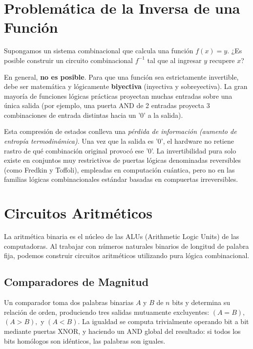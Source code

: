 \section{Problemática de la Inversa de una Función}
Supongamos un sistema combinacional que calcula una función $f(x) = y.$ ¿Es posible construir un circuito combinacional $f^{-1}$ tal que al ingresar $y$ recupere $x$?

En general, \textbf{no es posible}. Para que una función sea estrictamente invertible, debe ser matemática y lógicamente \textbf{biyectiva} (inyectiva y sobreyectiva). La gran mayoría de funciones lógicas prácticas proyectan muchas entradas sobre una única salida (por ejemplo, una puerta AND de 2 entradas proyecta 3 combinaciones de entrada distintas hacia un '0' a la salida).

Esta compresión de estados conlleva una \textit{pérdida de información (aumento de entropía termodinámica)}. Una vez que la salida es '0', el hardware no retiene rastro de qué combinación original provocó ese '0'. La invertibilidad pura solo existe en conjuntos muy restrictivos de puertas lógicas denominadas reversibles (como Fredkin y Toffoli), empleadas en computación cuántica, pero no en las familias lógicas combinacionales estándar basadas en compuertas irreversibles.

\section{Circuitos Aritméticos}
La aritmética binaria es el núcleo de las ALUs (Arithmetic Logic Units) de las computadoras. Al trabajar con números naturales binarios de longitud de palabra fija, podemos construir circuitos aritméticos utilizando pura lógica combinacional.

\subsection{Comparadores de Magnitud}
Un comparador toma dos palabras binarias $A$ y $B$ de $n$ bits y determina su relación de orden, produciendo tres salidas mutuamente excluyentes: $(A = B),$ $(A > B),$ y $(A < B).$ 
La igualdad se computa trivialmente operando bit a bit mediante puertas XNOR, y haciendo un AND global del resultado: si todos los bits homólogos son idénticos, las palabras son iguales.

